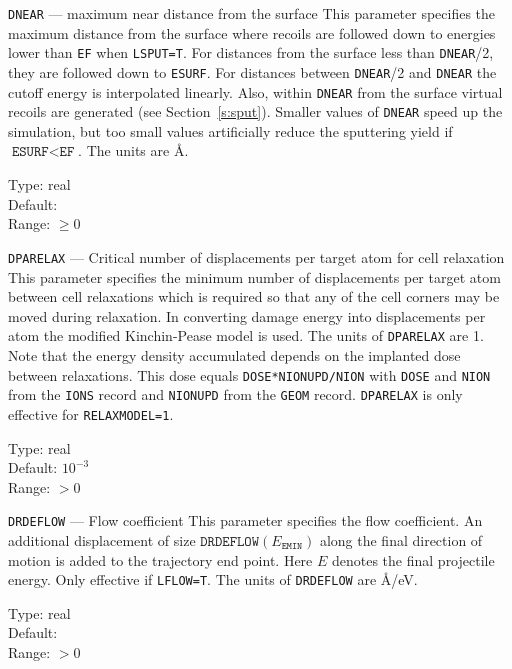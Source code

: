 \begin{keydescription}{\texttt{DNEAR} --- maximum near distance from the
    surface}
%
  This parameter specifies the maximum distance from the surface where recoils
  are followed down to energies lower than \texttt{EF} when \texttt{LSPUT=T}. 
  For distances from the surface less than \texttt{DNEAR}/2, they are followed 
  down to \texttt{ESURF}. For distances between \texttt{DNEAR}/2 and
  \texttt{DNEAR} the cutoff energy is interpolated linearly. Also, within 
  \texttt{DNEAR} from the surface virtual recoils are generated
  (see Section~\ref{s:sput}). Smaller values of \texttt{DNEAR} speed up
  the simulation, but too small values artificially reduce the sputtering 
  yield if $\texttt{ESURF} < \texttt{EF}$. The units are \AA.
  \begin{keytab}
    Type:    \> real \\
    Default:  \\
    Range: \> $\ge 0$
  \end{keytab}
\end{keydescription}

\begin{keydescription}{\texttt{DPARELAX} --- Critical number of displacements 
per target atom for cell relaxation}
%
  This parameter specifies the minimum number of displacements per target atom  
  between cell relaxations which is required so that any of the cell
  corners may be moved during relaxation. In converting damage energy into 
  displacements per atom the modified Kinchin-Pease model is used. The units of 
  \texttt{DPARELAX} are 1. Note that the energy density accumulated depends on 
  the implanted dose between relaxations. This dose equals 
  \texttt{DOSE*NIONUPD/NION} with \texttt{DOSE} and \texttt{NION} from the 
  \texttt{IONS} record and \texttt{NIONUPD} from the \texttt{GEOM} record. 
  \texttt{DPARELAX} is only effective for \texttt{RELAXMODEL=1}.
  \begin{keytab}
    Type:    \> real \\
    Default: \> $10^{-3}$ \\
    Range:   \> $> 0$
  \end{keytab}
\end{keydescription}

\ifprivate
\begin{keydescription}{\texttt{DRDEFLOW} --- Flow coefficient}
%
  This parameter specifies the flow coefficient. An additional displacement
  of size $\texttt{DRDEFLOW}(E_\texttt{EMIN})$ along the final direction of motion 
  is added to the trajectory end point. Here $E$ denotes the final projectile 
  energy. Only effective if \texttt{LFLOW=T}. The units of \texttt{DRDEFLOW} are
  \AA/eV.
  \begin{keytab}
    Type:    \> real \\
    Default:  \\
    Range:   \> $>0$
  \end{keytab}
\end{keydescription}
\fi

